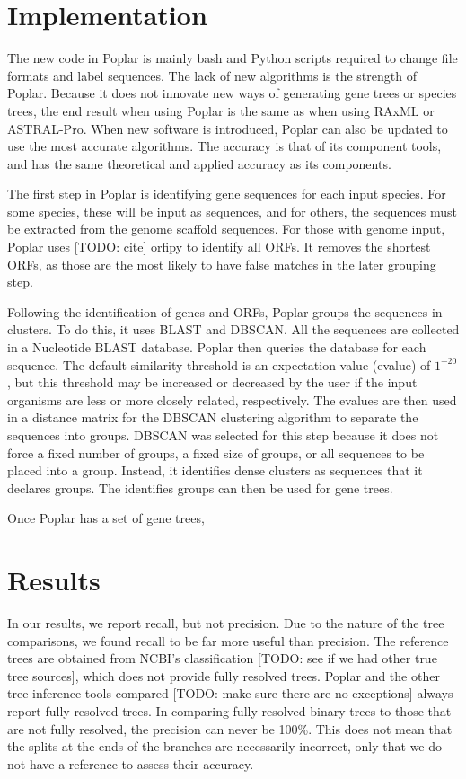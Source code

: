 \documentclass[manuscript,screen,review,nonacm]{acmart}
\begin{document}
\section{Implementation}

The new code in Poplar is mainly bash and Python scripts required to change file formats and label sequences. The lack of new algorithms is the strength of Poplar. Because it does not innovate new ways of generating gene trees or species trees, the end result when using Poplar is the same as when using RAxML or ASTRAL-Pro. When new software is introduced, Poplar can also be updated to use the most accurate algorithms. The accuracy is that of its component tools, and has the same theoretical and applied accuracy as its components.

The first step in Poplar is identifying gene sequences for each input species. For some species, these will be input as sequences, and for others, the sequences must be extracted from the genome scaffold sequences. For those with genome input, Poplar uses [TODO: cite] orfipy to identify all ORFs. It removes the shortest ORFs, as those are the most likely to have false matches in the later grouping step.

Following the identification of genes and ORFs, Poplar groups the sequences in clusters. To do this, it uses BLAST and DBSCAN. All the sequences are collected in a Nucleotide BLAST database. Poplar then queries the database for each sequence. The default similarity threshold is an expectation value (evalue) of $1^{-20}$, but this threshold may be increased or decreased by the user if the input organisms are less or more closely related, respectively. The evalues are then used in a distance matrix for the DBSCAN clustering algorithm to separate the sequences into groups. DBSCAN was selected for this step because it does not force a fixed number of groups, a fixed size of groups, or all sequences to be placed into a group. Instead, it identifies dense clusters as sequences that it declares groups. The identifies groups can then be used for gene trees.

Once Poplar has a set of gene trees, 



\section{Results}

In our results, we report recall, but not precision. Due to the nature of the tree comparisons, we found recall to be far more useful than precision. The reference trees are obtained from NCBI's classification [TODO: see if we had other true tree sources], which does not provide fully resolved trees. Poplar and the other tree inference tools compared [TODO: make sure there are no exceptions] always report fully resolved trees. In comparing fully resolved binary trees to those that are not fully resolved, the precision can never be 100\%. This does not mean that the splits at the ends of the branches are necessarily incorrect, only that we do not have a reference to assess their accuracy.
\end{document}
